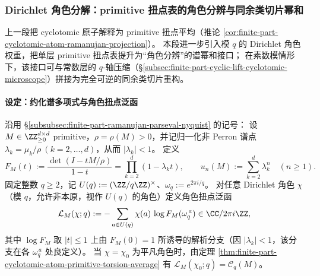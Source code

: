 
\subsubsection{Dirichlet 角色分解：primitive 扭点表的角色分辨与同余类切片幂和}\label{subsubsec:finite-part-dirichlet-character-torsion-spectral-slices}
上一段把 cyclotomic 原子解释为 primitive 扭点平均（推论 \ref{cor:finite-part-cyclotomic-atom-ramanujan-projection}）。
本段进一步引入模 \(q\) 的 Dirichlet 角色权重，把单层 primitive 扭点表提升为“角色分辨”的谱幂和接口；
在素数模情形下，该接口可与常数层的 \(q\)-轴压缩（\S\ref{subsec:finite-part-cyclic-lift-cyclotomic-microscope}）拼接为完全可逆的同余类切片重构。

\paragraph{设定：约化谱多项式与角色扭点泛函}
沿用 \S\ref{subsubsec:finite-part-ramanujan-parseval-nyquist} 的记号：
设 \(M\in\ZZ_{\ge0}^{d\times d}\) primitive，\(\rho=\rho(M)>0\)，并记归一化非 Perron 谱点 \(\lambda_k=\mu_k/\rho\ (k=2,\dots,d)\)，从而 \(|\lambda_k|<1\)。
定义
\[
F_M(t):=\frac{\det(I-tM/\rho)}{1-t}=\prod_{k=2}^{d}(1-\lambda_k t),
\qquad
u_n(M):=\sum_{k=2}^{d}\lambda_k^{n}\quad(n\ge1).
\]
固定整数 \(q\ge2\)，记 \(U(q):=(\ZZ/q\ZZ)^\times\)、\(\omega_q:=e^{2\pi i/q}\)。
对任意 Dirichlet 角色 \(\chi\)（模 \(q\)，允许非本原，视作 \(U(q)\) 的角色）定义角色扭点泛函
\[
\mathcal{L}_M(\chi;q):=-\sum_{a\in U(q)}\chi(a)\,\log F_M(\omega_q^{\,a})\in\CC/2\pi i\ZZ,
\]
其中 \(\log F_M\) 取 \(|t|\le1\) 上由 \(F_M(0)=1\) 所诱导的解析分支（因 \(|\lambda_k|<1\)，该分支在各 \(\omega_q^{\,a}\) 处良定义）。
当 \(\chi=\chi_0\) 为平凡角色时，由定理 \ref{thm:finite-part-cyclotomic-atom-primitive-torsion-average} 有 \(\mathcal{L}_M(\chi_0;q)=\mathcal{C}_q(M)\)。

